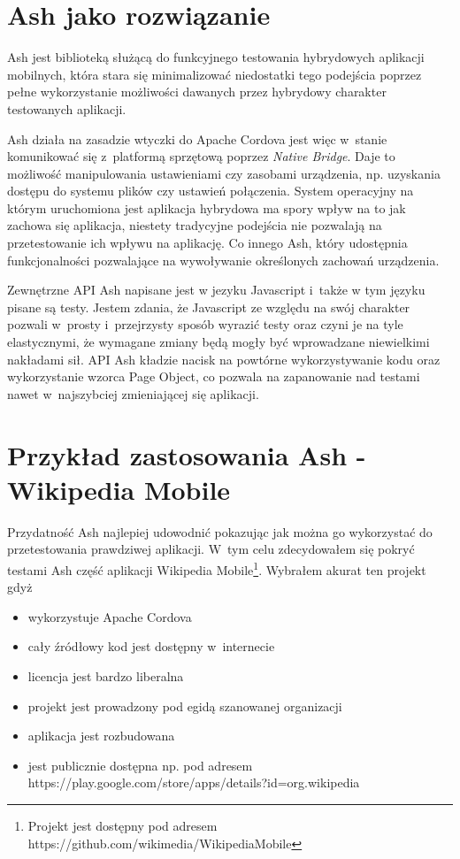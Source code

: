 \documentclass[brudnopis]{xmgr}
\begin{document}
                                                                                                                                                                 
\section{Ash jako rozwiązanie}

Ash jest biblioteką służącą do funkcyjnego testowania hybrydowych aplikacji mobilnych, która stara się minimalizować niedostatki tego podejścia poprzez pełne wykorzystanie możliwości dawanych przez hybrydowy charakter testowanych aplikacji. 

Ash działa na zasadzie wtyczki do Apache Cordova jest więc w~stanie komunikować się z~platformą sprzętową poprzez \textit{Native Bridge}. Daje to możliwość manipulowania ustawieniami czy zasobami urządzenia, np. uzyskania dostępu do systemu plików czy ustawień połączenia. System operacyjny na którym uruchomiona jest aplikacja hybrydowa ma spory wpływ na to jak zachowa się aplikacja, niestety tradycyjne podejścia nie pozwalają na przetestowanie ich wpływu na aplikację. Co innego Ash, który udostępnia funkcjonalności pozwalające na wywoływanie określonych zachowań urządzenia. 

Zewnętrzne API Ash napisane jest w jezyku Javascript i~także w tym języku pisane są testy. Jestem zdania, że Javascript ze względu na swój charakter pozwali w~prosty i~przejrzysty sposób wyrazić testy oraz czyni je na tyle elastycznymi, że wymagane zmiany będą mogły być wprowadzane niewielkimi nakładami sił. API Ash kładzie nacisk na powtórne wykorzystywanie kodu oraz wykorzystanie wzorca Page Object, co pozwala na zapanowanie nad testami nawet w~najszybciej zmieniającej się aplikacji. 

\section{Przykład zastosowania Ash - Wikipedia Mobile}

Przydatność Ash najlepiej udowodnić pokazując jak można go wykorzystać do przetestowania prawdziwej aplikacji. W~tym celu zdecydowałem się pokryć testami Ash część aplikacji Wikipedia Mobile\footnote{Projekt jest dostępny pod adresem https://github.com/wikimedia/WikipediaMobile}. Wybrałem akurat ten projekt gdyż

\begin{itemize}
  \item wykorzystuje Apache Cordova
  \item cały źródłowy kod jest dostępny w~internecie
  \item licencja jest bardzo liberalna
  \item projekt jest prowadzony pod egidą szanowanej organizacji
  \item aplikacja jest rozbudowana
  \item jest publicznie dostępna np. pod adresem https://play.google.com/store/apps/details?id=org.wikipedia
\end{itemize}
\end{document}
